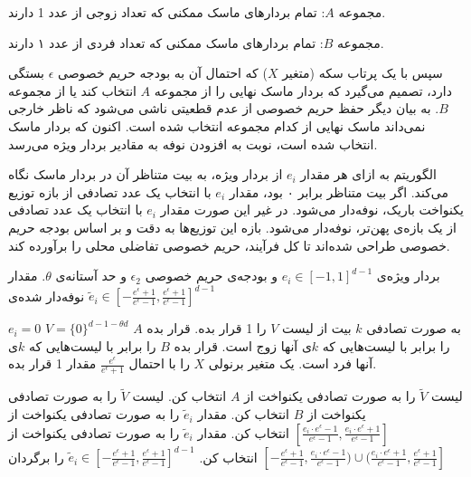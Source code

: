  مجموعه $A$: تمام بردارهای ماسک ممکنی که تعداد زوجی از عدد 1 دارند.

 مجموعه $B$: تمام بردارهای ماسک ممکنی که تعداد فردی از عدد ۱ دارند.


سپس با یک پرتاب سکه (متغیر $X$) که احتمال آن به بودجه حریم خصوصی $\epsilon$ بستگی دارد، تصمیم می‌گیرد که بردار ماسک نهایی را از مجموعه $A$ انتخاب کند یا از مجموعه $B$. به بیان دیگر حفظ حریم خصوصی از عدم قطعیتی ناشی می‌شود که ناظر خارجی نمی‌داند ماسک نهایی از کدام مجموعه انتخاب شده است. اکنون که بردار ماسک انتخاب شده است، نوبت به افزودن نوفه به مقادیر بردار ویژه می‌رسد.

الگوریتم به ازای هر مقدار $e_i$ از بردار ویژه، به بیت متناظر آن در بردار ماسک نگاه می‌کند. اگر بیت متناظر برابر ۰ بود، مقدار $e_i$ با انتخاب یک عدد تصادفی از بازه توزیع یکنواخت باریک، نوفه‌دار می‌شود. در غیر این صورت مقدار $e_i$ با انتخاب یک عدد تصادفی از یک بازه‌ی پهن‌تر، نوفه‌دار می‌شود. بازه این توزیع‌ها به دقت و بر اساس بودجه حریم خصوصی طراحی شده‌اند تا کل فرآیند، حریم خصوصی تفاضلی محلی را برآورده کند.

 بردار ویژه‌ی  $e_i \in [-1, 1]^{d-1}$ و بودجه‌ی حریم خصوصی $\epsilon_2$ و حد آستانه‌ی $\theta$.
 مقدار نوفه‌دار شده‌ی $\tilde{e}_i \in [-\frac{e^{\epsilon}+1}{e^{\epsilon}-1}, \frac{e^{\epsilon}+1}{e^{\epsilon}-1}]^{d-1}$

        \State $e_i = 0$
    \EndIf
\EndFor
{} $V = \{0\}^{d-1-\theta d}$
 به صورت تصادفی $k$ بیت از لیست $V$ را 1 قرار بده.
 قرار بده $A$ را برابر با لیست‌هایی که $k$ی آنها زوج است.
 قرار بده $B$ را برابر با لیست‌هایی که $k$ی آنها فرد است.
 یک متغیر برنولی $X$ را با احتمال $\frac{e^{\epsilon}}{e^{\epsilon}+1}$ مقدار 1 قرار بده.

     لیست $\tilde{V}$ را به صورت تصادفی یکنواخت از $A$ انتخاب کن.
\Else
     لیست $\tilde{V}$ را به صورت تصادفی یکنواخت از $B$ انتخاب کن.
\EndIf
{}
         مقدار $\tilde{e}_i$ را به صورت تصادفی یکنواخت از $[\frac{e_i \cdot e^{\epsilon}-1}{e^{\epsilon}-1}, \frac{e_i \cdot e^{\epsilon}+1}{e^{\epsilon}-1}]$ انتخاب کن.
    \Else
         مقدار $\tilde{e}_i$ را به صورت تصادفی یکنواخت از $[-\frac{e^{\epsilon}+1}{e^{\epsilon}-1}, \frac{e_i \cdot e^{\epsilon}-1}{e^{\epsilon}-1}) \cup (\frac{e_i \cdot e^{\epsilon}+1}{e^{\epsilon}-1}, \frac{e^{\epsilon}+1}{e^{\epsilon}-1}]$ انتخاب کن.
    \EndIf
\EndFor
{} $\tilde{e}_i \in [-\frac{e^{\epsilon}+1}{e^{\epsilon}-1}, \frac{e^{\epsilon}+1}{e^{\epsilon}-1}]^{d-1}$ را برگردان

